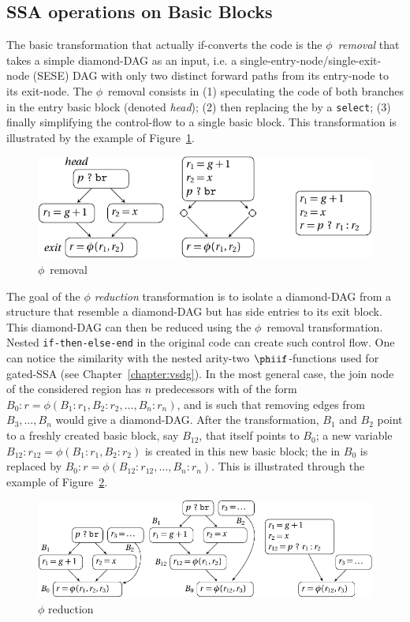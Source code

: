 \subsection{SSA operations on Basic Blocks}

The basic transformation that actually if-converts the code is the \emph{$\phi$~removal} that takes a simple diamond-DAG  as an input, i.e. a single-entry-node/single-exit-node (SESE) DAG with only two distinct forward paths from its entry-node to its exit-node. The $\phi$~removal consists in (1) speculating the code of both branches in the entry basic block (denoted \textit{head}); (2) then replacing the \phifun by a \texttt{select}; (3) finally simplifying the control-flow to a single basic block. This transformation is illustrated by the example of Figure~\ref{fig:phi_rem}. 
\begin{figure}[h]
  \includegraphics[scale=0.9]{phi_removal}
  \caption{$\phi$~removal\label{fig:phi_rem}}
\end{figure}

The goal of the \emph{$\phi$ reduction} transformation is to isolate a diamond-DAG from a structure that resemble a diamond-DAG but has side entries to its exit block. This diamond-DAG can then be reduced using the $\phi$~removal transformation. Nested \texttt{if-then-else-end} in the original code can create such control flow. One can notice the similarity with the nested arity-two $\phiif$-functions used for gated-SSA (see Chapter~\ref{chapter:vsdg}). In the most general case, the join node of the considered region has $n$ predecessors with \phifuns of the form $B_0:r=\phi(B_1:r_1,B_2:r_2,\dots,B_n:r_n)$, and is such that removing edges from $B_3,\dots, B_n$ would give a diamond-DAG. After the transformation, $B_1$ and $B_2$ point to a freshly created basic block, say $B_{12}$, that itself points to $B_0$; a new variable $B_{12}:r_{12}=\phi(B_1:r_1,B_2:r_2)$ is created in this new basic block; the \phifun in $B_0$ is replaced by $B_0:r=\phi(B_{12}:r_{12},\dots,B_n:r_n)$. This is illustrated through the example of Figure~\ref{fig:phi_red}.
\begin{figure}[h]
  \includegraphics[scale=0.9]{phi_reduction}
  \caption{\label{fig:phi_red}$\phi$ reduction}
\end{figure}

